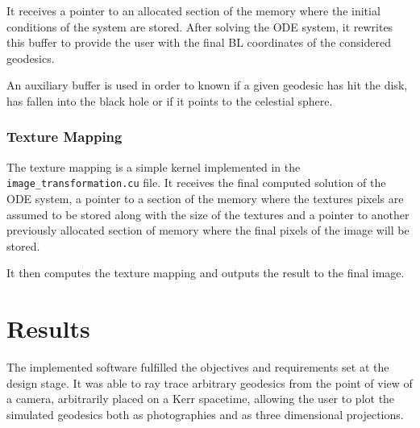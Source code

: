 It receives a pointer to an allocated section of the memory where the initial conditions of the system are stored. After solving the \ac{ODE} system, it rewrites this buffer to provide the user with the final \ac{BL} coordinates of the considered geodesics.

An auxiliary buffer is used in order to known if a given geodesic has hit the disk, has fallen into the black hole or if it points to the celestial sphere.

\subsubsection*{Texture Mapping}

The texture mapping is a simple kernel implemented in the \lstinline{image_transformation.cu} file. It receives the final computed solution of the \ac{ODE} system, a pointer to a section of the memory where the textures pixels are assumed to be stored along with the size of the textures and a pointer to another previously allocated section of memory where the final pixels of the image will be stored.

It then computes the texture mapping and outputs the result to the final image.




















\section{Results}
\label{chapter:results}

The implemented software fulfilled the objectives and requirements set at the design stage. It was able to ray trace arbitrary geodesics from the point of view of a camera, arbitrarily placed on a Kerr spacetime, allowing the user to plot the simulated geodesics both as photographies and as three dimensional projections.

